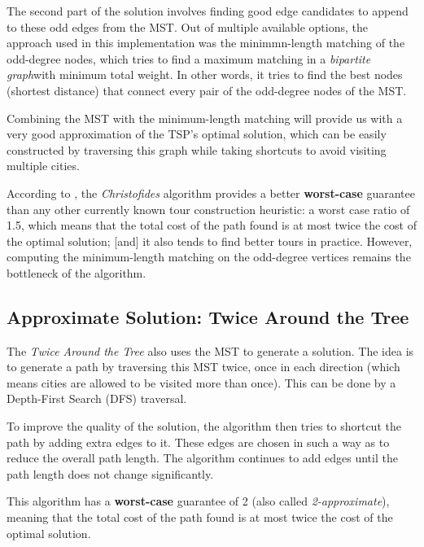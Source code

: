 \documentclass[12pt]{article}
\begin{document}
The second part of the solution involves finding good edge candidates to append to these odd 
edges from the MST. Out of multiple available options, the approach used in this implementation was the minimmn-length
matching of the odd-degree nodes, which tries to find a maximum matching in a \textit{bipartite 
graph}\footnotemark with minimum total weight. In other words, it tries to find the best nodes (shortest distance) 
that connect every pair of the odd-degree nodes of the MST.


Combining the MST with the minimum-length matching will provide us with a very good 
approximation of the TSP's optimal solution, which can be easily constructed by
traversing this graph while taking shortcuts to avoid visiting multiple cities.

According to \cite{Johnson2003}, the \textit{Christofides} algorithm provides a better 
\textbf{worst-case} guarantee than any other currently known tour construction heuristic: a worst case ratio of 1.5, which means that the total cost of the path found is at most twice the cost of the optimal solution; 
[and] it also tends to find better tours in practice. However, computing the minimum-length 
matching on the odd-degree vertices remains the bottleneck of the algorithm.

\subsection{Approximate Solution: Twice Around the Tree} \label{sec:twice_explanation}

The \textit{Twice Around the Tree} also uses the MST to generate a solution. The idea is to generate a path by 
traversing this MST twice, once in each direction (which means cities are allowed to be visited 
more than once). This can be done by a Depth-First Search (DFS) traversal.

To improve the quality of the solution, the algorithm then tries to shortcut the 
path by adding extra edges to it. These edges are chosen in such a way as to reduce 
the overall path length. The algorithm continues to add edges until the path length 
does not change significantly.

This algorithm has a \textbf{worst-case} guarantee of 2 (also called \textit{2-approximate}), meaning 
that the total cost of the path found is at most twice the cost of the optimal solution.
\end{document}
